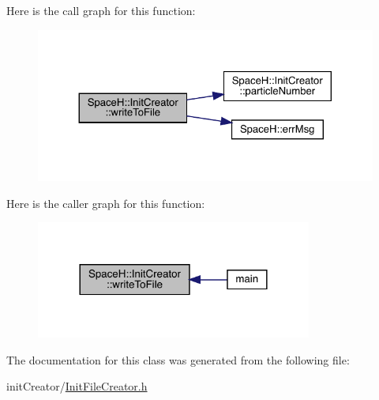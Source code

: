 Here is the call graph for this function\+:
\nopagebreak
\begin{figure}[H]
\begin{center}
\leavevmode
\includegraphics[width=324pt]{class_space_h_1_1_init_creator_a6cf46010b11b3b7ad19f1d37e2cb1cb4_cgraph}
\end{center}
\end{figure}
Here is the caller graph for this function\+:
\nopagebreak
\begin{figure}[H]
\begin{center}
\leavevmode
\includegraphics[width=257pt]{class_space_h_1_1_init_creator_a6cf46010b11b3b7ad19f1d37e2cb1cb4_icgraph}
\end{center}
\end{figure}


The documentation for this class was generated from the following file\+:\begin{DoxyCompactItemize}
\item 
init\+Creator/\mbox{\hyperlink{_init_file_creator_8h}{Init\+File\+Creator.\+h}}\end{DoxyCompactItemize}
